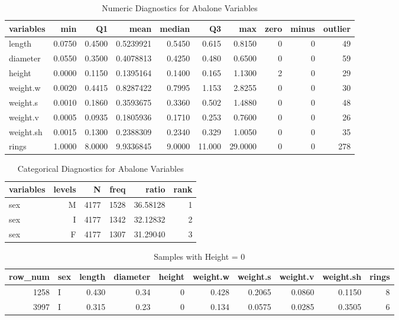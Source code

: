 \documentclass[12pt]{article}
\begin{document}
	
	\begin{table}[!h]
		\centering
		\caption{\label{tab:EDA}Numeric Diagnostics for Abalone Variables}
		\begin{tabular}{lrrrrrrrrr}
			\toprule
			variables & min & Q1 & mean & median & Q3 & max & zero & minus & outlier\\
			\midrule
			length   & 0.0750 & 0.4500 & 0.5239921 & 0.5450 & 0.615 & 0.8150 & 0 & 0 & 49\\
			diameter & 0.0550 & 0.3500 & 0.4078813 & 0.4250 & 0.480 & 0.6500 & 0 & 0 & 59\\
			height   & 0.0000 & 0.1150 & 0.1395164 & 0.1400 & 0.165 & 1.1300 & 2 & 0 & 29\\
			weight.w & 0.0020 & 0.4415 & 0.8287422 & 0.7995 & 1.153 & 2.8255 & 0 & 0 & 30\\
			weight.s & 0.0010 & 0.1860 & 0.3593675 & 0.3360 & 0.502 & 1.4880 & 0 & 0 & 48\\
			weight.v & 0.0005 & 0.0935 & 0.1805936 & 0.1710 & 0.253 & 0.7600 & 0 & 0 & 26\\
			weight.sh& 0.0015 & 0.1300 & 0.2388309 & 0.2340 & 0.329 & 1.0050 & 0 & 0 & 35\\
			rings    & 1.0000 & 8.0000 & 9.9336845 & 9.0000 & 11.000& 29.0000 & 0 & 0 & 278\\
			\bottomrule
		\end{tabular}
	\end{table}
	
	\begin{table}[!h]
		\centering
		\caption{\label{tab:EDA_cat}Categorical Diagnostics for Abalone Variables}
		\begin{tabular}{lrrrrr}
			\toprule
			variables & levels & N & freq & ratio & rank\\
			\midrule
			sex & M & 4177 & 1528 & 36.58128 & 1\\
			sex & I & 4177 & 1342 & 32.12832 & 2\\
			sex & F & 4177 & 1307 & 31.29040 & 3\\
			\bottomrule
		\end{tabular}
	\end{table}
	
	\begin{table}[!h]
		\centering
		\caption{\label{tab:height_zero}Samples with Height = 0}
		\begin{tabular}{r l r r r r r r r r}
			\toprule
			row\_num & sex & length & diameter & height & weight.w & weight.s & weight.v & weight.sh & rings\\
			\midrule
			1258 & I & 0.430 & 0.34 & 0 & 0.428 & 0.2065 & 0.0860 & 0.1150 & 8\\
			3997 & I & 0.315 & 0.23 & 0 & 0.134 & 0.0575 & 0.0285 & 0.3505 & 6\\
			\bottomrule
		\end{tabular}
	\end{table}
	
\end{document}

